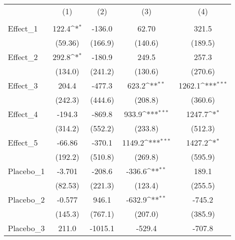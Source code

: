 {
\def\sym#1{\ifmmode^{#1}\else\(^{#1}\)\fi}
\begin{tabular}{l*{4}{c}}
\toprule
            &\multicolumn{1}{c}{(1)}&\multicolumn{1}{c}{(2)}&\multicolumn{1}{c}{(3)}&\multicolumn{1}{c}{(4)}\\
            &\multicolumn{1}{c}{} &\multicolumn{1}{c}{} &\multicolumn{1}{c}{} &\multicolumn{1}{c}{} \\
\midrule
Effect\_1    &       122.4\sym{*}  &      -136.0         &       62.70         &       321.5         \\
            &     (59.36)         &     (166.9)         &     (140.6)         &     (189.5)         \\
\addlinespace
Effect\_2    &       292.8\sym{*}  &      -180.9         &       249.5         &       257.3         \\
            &     (134.0)         &     (241.2)         &     (130.6)         &     (270.6)         \\
\addlinespace
Effect\_3    &       204.4         &      -477.3         &       623.2\sym{**} &      1262.1\sym{***}\\
            &     (242.3)         &     (444.6)         &     (208.8)         &     (360.6)         \\
\addlinespace
Effect\_4    &      -194.3         &      -869.8         &       933.9\sym{***}&      1247.7\sym{*}  \\
            &     (314.2)         &     (552.2)         &     (233.8)         &     (512.3)         \\
\addlinespace
Effect\_5    &      -66.86         &      -370.1         &      1149.2\sym{***}&      1427.2\sym{*}  \\
            &     (192.2)         &     (510.8)         &     (269.8)         &     (595.9)         \\
\addlinespace
Placebo\_1   &      -3.701         &      -208.6         &      -336.6\sym{**} &       189.1         \\
            &     (82.53)         &     (221.3)         &     (123.4)         &     (255.5)         \\
\addlinespace
Placebo\_2   &      -0.577         &       946.1         &      -632.9\sym{**} &      -745.2         \\
            &     (145.3)         &     (767.1)         &     (207.0)         &     (385.9)         \\
\addlinespace
Placebo\_3   &       211.0         &     -1015.1         &      -529.4         &      -707.8         \\

\end{tabular}}
